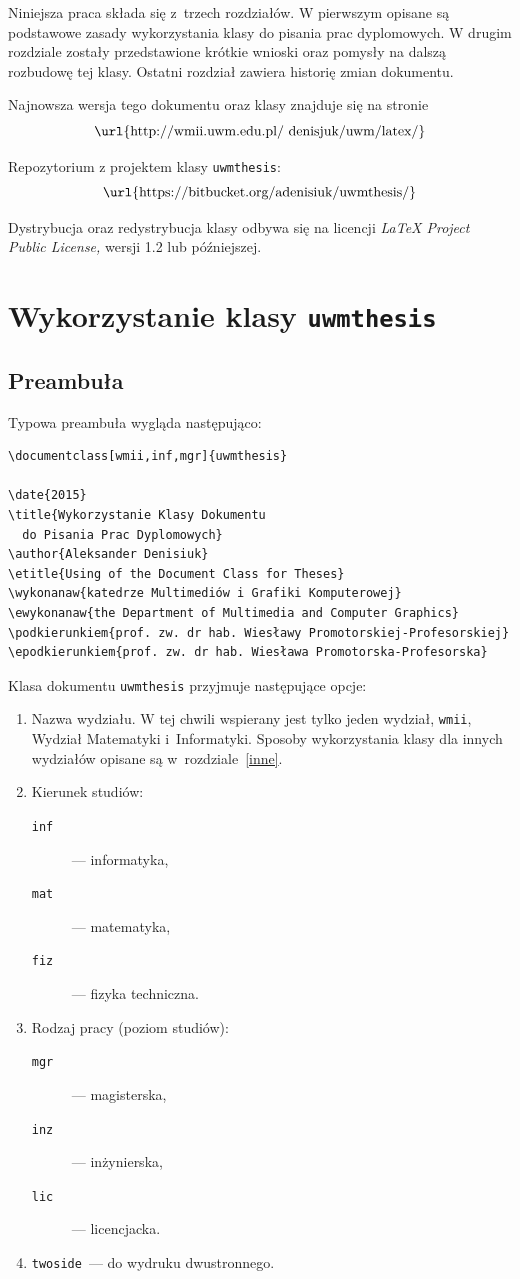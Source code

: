 \documentclass[wmii, inf, mgr]{uwmthesis}
\begin{document}
Niniejsza praca składa się z~trzech rozdziałów. W pierwszym opisane są podstawowe zasady wykorzystania klasy do pisania prac dyplomowych. W drugim rozdziale zostały przedstawione krótkie wnioski oraz pomysły na dalszą rozbudowę tej klasy.
Ostatni rozdział zawiera historię zmian dokumentu.

Najnowsza wersja tego dokumentu oraz klasy znajduje się na stronie $$\hbox{\url{http://wmii.uwm.edu.pl/~denisjuk/uwm/latex/}}$$

Repozytorium z projektem klasy \texttt{uwmthesis}:
  $$\hbox{\url{https://bitbucket.org/adenisiuk/uwmthesis/}}$$

Dystrybucja oraz redystrybucja klasy odbywa się na licencji \emph{LaTeX Project Public License,} wersji 1.2 lub późniejszej.


\chapter{Wykorzystanie klasy \texttt{uwmthesis}}
\section{Preambuła}

Typowa preambuła wygląda następująco:
\begin{verbatim}
\documentclass[wmii,inf,mgr]{uwmthesis}

\date{2015}
\title{Wykorzystanie Klasy Dokumentu 
  do Pisania Prac Dyplomowych}
\author{Aleksander Denisiuk}
\etitle{Using of the Document Class for Theses}
\wykonanaw{katedrze Multimediów i Grafiki Komputerowej}
\ewykonanaw{the Department of Multimedia and Computer Graphics}
\podkierunkiem{prof. zw. dr hab. Wiesławy Promotorskiej-Profesorskiej}
\epodkierunkiem{prof. zw. dr hab. Wiesława Promotorska-Profesorska}
\end{verbatim}

Klasa dokumentu \texttt{uwmthesis} przyjmuje następujące opcje:
\begin{enumerate}
 \item Nazwa wydziału. W tej chwili wspierany jest tylko jeden wydział, \texttt{wmii}, Wydział Matematyki i~Informatyki. Sposoby wykorzystania klasy dla innych wydziałów opisane są w~rozdziale~\ref{inne}.
 \item Kierunek studiów:
 \begin{description}
  \item [\texttt{inf}]--- informatyka,
  \item [\texttt{mat}]--- matematyka,
  \item [\texttt{fiz}]--- fizyka techniczna.
 \end{description}
\item Rodzaj pracy (poziom studiów):
 \begin{description}
  \item [\texttt{mgr}]--- magisterska,
  \item [\texttt{inz}]--- inżynierska,
  \item [\texttt{lic}]--- licencjacka.
 \end{description}
\item \texttt{twoside}~--- do wydruku dwustronnego.
\end{enumerate}
\end{document}
